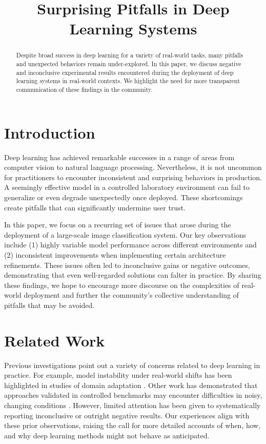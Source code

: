 \documentclass{article}
\title{Surprising Pitfalls in Deep Learning Systems}
\date{}
\begin{document}
\maketitle

\begin{abstract}
Despite broad success in deep learning for a variety of real-world tasks, many pitfalls and unexpected behaviors remain under-explored. In this paper, we discuss negative and inconclusive experimental results encountered during the deployment of deep learning systems in real-world contexts. We highlight the need for more transparent communication of these findings in the community.
\end{abstract}

\section{Introduction}
Deep learning has achieved remarkable successes in a range of areas from computer vision to natural language processing. Nevertheless, it is not uncommon for practitioners to encounter inconsistent and surprising behaviors in production. A seemingly effective model in a controlled laboratory environment can fail to generalize or even degrade unexpectedly once deployed. These shortcomings create pitfalls that can significantly undermine user trust.

In this paper, we focus on a recurring set of issues that arose during the deployment of a large-scale image classification system. Our key observations include (1) highly variable model performance across different environments and (2) inconsistent improvements when implementing certain architecture refinements. These issues often led to inconclusive gains or negative outcomes, demonstrating that even well-regarded solutions can falter in practice. By sharing these findings, we hope to encourage more discourse on the complexities of real-world deployment and further the community's collective understanding of pitfalls that may be avoided.

\section{Related Work}
Previous investigations point out a variety of concerns related to deep learning in practice. For example, model instability under real-world shifts has been highlighted in studies of domain adaptation \cite{smith2021}. Other work has demonstrated that approaches validated in controlled benchmarks may encounter difficulties in noisy, changing conditions \cite{brown2020}. However, limited attention has been given to systematically reporting inconclusive or outright negative results. Our experiences align with these prior observations, raising the call for more detailed accounts of when, how, and why deep learning methods might not behave as anticipated.
\end{document}

